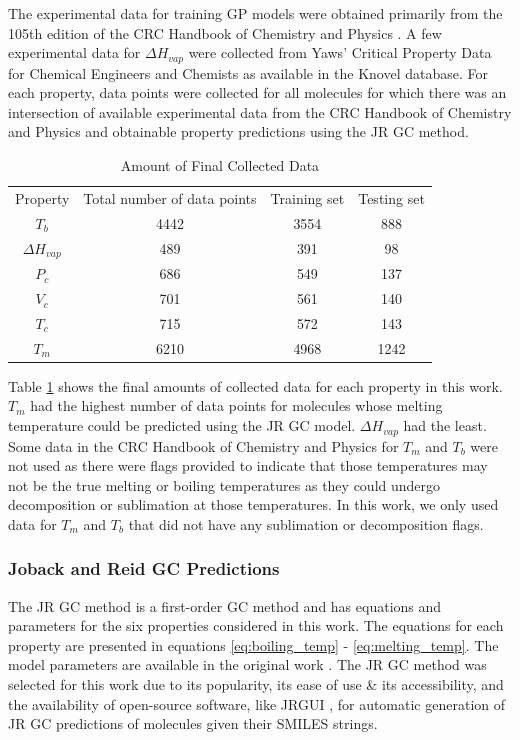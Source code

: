 \documentclass[journal=jacsat,manuscript=article]{achemso}
\begin{document}
The experimental data for training GP models were obtained primarily from the 105th edition of the CRC Handbook of Chemistry and Physics \cite{bookRumble2023}. A few experimental data for $\Delta H_{vap}$ were collected from Yaws' Critical Property Data for Chemical Engineers and Chemists \cite{yaws-critical-property} as available in the Knovel database.
For each property, data points were collected for all molecules for which there was an intersection of available experimental data from the CRC Handbook of Chemistry and Physics and obtainable property predictions using the JR GC method.

\begin{table}
    \centering
    \begin{tabular}{cccc}
         Property&  Total number of data points&  Training set& Testing set
         
\\
         $T_b$&  4442&  3554& 888
\\
         $\Delta H_{vap}$&  489&  391& 98
\\
         $P_c$&  686&  549& 137
\\
         $V_c$&  701&  561& 140
\\
         $T_c$&  715&  572& 143
\\
         $T_m$&  6210&  4968& 1242
\\
    \end{tabular}
    \caption{Amount of Final Collected Data}
    \label{tab:collected_data}
\end{table}

Table \ref{tab:collected_data} shows the final amounts of collected data for each property in this work. $T_m$ had the highest number of data points for molecules whose melting temperature could be predicted using the JR GC model. $\Delta H_{vap}$ had the least. Some data in the CRC Handbook of Chemistry and Physics for $T_m$ and $T_b$ were not used as there were flags provided to indicate that those temperatures may not be the true melting or boiling temperatures as they could undergo decomposition or sublimation at those temperatures. In this work, we only used data for $T_m$ and $T_b$ that did not have any sublimation or decomposition flags.

\subsubsection{Joback and Reid GC Predictions}
The JR GC method is a first-order GC method and has equations and parameters for the six properties considered in this work. The equations for each property are presented in equations \ref{eq:boiling_temp} - \ref{eq:melting_temp}. The model parameters are available in the original work \cite{jobackEstimationPureComponentProperties1987}.
The JR GC method was selected for this work due to its popularity, its ease of use \& its accessibility, and the availability of open-source software, like JRGUI \cite{shiJRguiPythonProgram2017}, for automatic generation of JR GC predictions of molecules given their SMILES strings.
\end{document}
